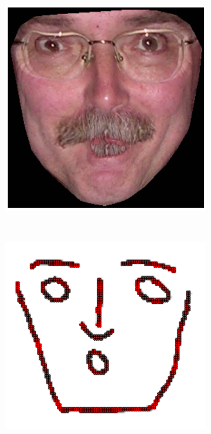 \begin{figure}[h!]
\begin{subfigure}[b]{0.1\textwidth}
    \end{subfigure}
    \hfill
    \begin{subfigure}[b]{0.1\textwidth}
            \includegraphics[width=\textwidth]{resources/Fig_Draw/test_02_of}
    \end{subfigure}
    \\
    \begin{subfigure}[b]{0.1\textwidth}
            \includegraphics[width=\textwidth]{resources/Fig_Draw/test_03}

\end{subfigure}
\end{figure}
